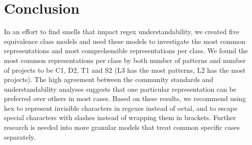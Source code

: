
\section{Conclusion}
\label{sec:conclusion}
In an effort to find smells that impact regex understandability, we created five equivalence class models and used these models to investigate the most common representations and most comprehensible representations per class.  
We found the most common representations per class by both number of patterns and number of projects to be C1, D2, T1 and S2 (L3 has the most patterns, L2 has the most projects).
 The high agreement between the community standards and understandability analyses  suggests that one particular representation can be preferred over others in most cases.  
Based on these results, we recommend using hex to represent invisible characters in regexes instead of octal, and to escape special characters with slashes instead of wrapping them in brackets.  
Further research is needed into more granular models that treat common specific cases separately.
